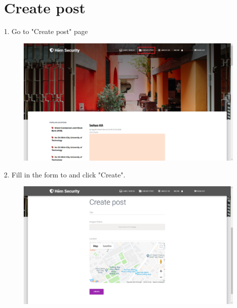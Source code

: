 \section{Create post}
1. Go to "Create post" page
\begin{center}
    \begin{figure}[H]
    \centering
    \includegraphics[width=1\columnwidth]{images/chap6/instruction7.png}
    \end{figure}
\end{center}
2. Fill in the form to and click "Create". 
\begin{center}
    \begin{figure}[H]
    \centering
    \includegraphics[width=1\columnwidth]{images/chap6/instruction8.png}
    \end{figure}
\end{center}
